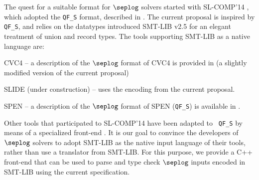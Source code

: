 \documentclass[10pt]{llncs}
\begin{document}
The quest for a suitable format for $\seplog$ solvers started with
SL-COMP'14 \cite{sl-comp14}, which adopted the {\tt QF\_S} format,
described in \cite{qfs}. The current proposal is inspired by {\tt
  QF\_S}, and relies on the datatypes introduced SMT-LIB v2.5 for an
elegant treatment of union and record types. The tools supporting
SMT-LIB as a native language are: \begin{compactitem}
\item CVC4 \cite{ReynoldsIosifKingSerban16} -- a description of the $\seplog$
  format of CVC4 is provided in \cite{cvc4-seplog} (a slightly
  modified version of the current proposal)
\item SLIDE (under construction) -- uses the encoding from the current
  proposal.
\item SPEN \cite{spen} -- a description of the $\seplog$
  format of SPEN ({\tt QF\_S}) is available in \cite{qfs}.
\end{compactitem} 
Other tools that participated to SL-COMP'14 have been adapted to {\tt
  QF\_S} by means of a specialized front-end \cite{qfs-frontend}. It
is our goal to convince the developers of $\seplog$ solvers to adopt
SMT-LIB as the native input language of their tools, rather than use a
translator from SMT-LIB. For this purpose, we provide a C++ front-end
\cite{smtlib-frontend} that can be used to parse and type check
$\seplog$ inputs encoded in SMT-LIB using the current specification. 

 


\end{document}
